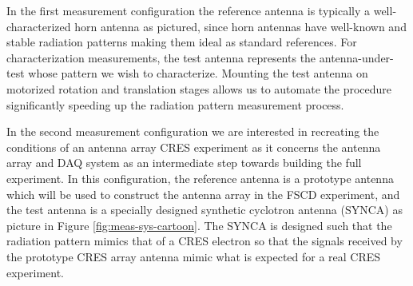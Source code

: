 In the first measurement configuration the reference antenna is typically a well-characterized horn antenna as pictured, since horn antennas have well-known and stable radiation patterns making them ideal as standard references. For characterization measurements, the test antenna represents the antenna-under-test whose pattern we wish to characterize. Mounting the test antenna on motorized rotation and translation stages allows us to automate the procedure significantly speeding up the radiation pattern measurement process. 

In the second measurement configuration we are interested in recreating the conditions of an antenna array CRES experiment as it concerns the antenna array and DAQ system as an intermediate step towards building the full experiment. In this configuration, the reference antenna is a prototype antenna which will be used to construct the antenna array in the FSCD experiment, and the test antenna is a specially designed synthetic cyclotron antenna (SYNCA) as picture in Figure \ref{fig:meas-sys-cartoon}. The SYNCA is designed such that the radiation pattern mimics that of a CRES electron so that the signals received by the prototype CRES array antenna mimic what is expected for a real CRES experiment. 


